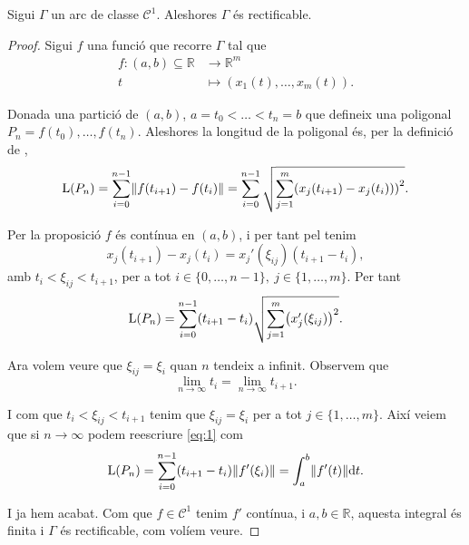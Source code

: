 \documentclass[../Apunts.tex]{subfiles}
\begin{document}
	\begin{proposition}
		Sigui \(\Gamma\) un arc de classe \(\mathcal{C}^{1}\). Aleshores \(\Gamma\) és rectificable.
		\begin{proof}
			Sigui \(f\) una funció que recorre \(\Gamma\) tal que
			\begin{align*}
			f\colon(a,b)\subseteq\mathbb{R}&\longrightarrow\mathbb{R}^{m}\\
			t&\longmapsto(x_{1}(t),\dots,x_{m}(t)).
			\end{align*}
			
			Donada una partició de \((a,b)\), \(a=t_{0}<\dots<t_{n}=b\) que defineix una poligonal \(P_{n}=f(t_{0}),\dots,f(t_{n})\). Aleshores la longitud de la poligonal  és, per la definició de ,
			\[\Long(P_n)=\sum_{i=0}^{n-1}\norm{f(t_{i+1})-f(t_{i})}=\sum_{i=0}^{n-1}\sqrt{\sum_{j=1}^{m}\left(x_{j}(t_{i+1})-x_{j}(t_{i}))\right)^{2}}.\]
			
			Per la proposició  \(f\) és contínua en \((a,b)\), i per tant pel  tenim
			\[x_{j}(t_{i+1})-x_{j}(t_{i})=x_{j}'(\xi_{ij})(t_{i+1}-t_{i}),\]
			amb \(t_{i}<\xi_{ij}<t_{i+1}\), per a tot \(i\in\{0,\dots,n-1\},\ j\in\{1,\dots,m\}\). Per tant
			\begin{equation}\label{eq:1}
			\Long(P_{n})=\sum_{i=0}^{n-1}(t_{i+1}-t_{i})\sqrt{\sum_{j=1}^{m}\left(x_{j}'(\xi_{ij})\right)^2}.
			\end{equation}
			
			Ara volem veure que \(\xi_{ij}=\xi_{i}\) quan \(n\) tendeix a infinit. Observem que
			\[\lim_{n\to\infty}t_{i}=\lim_{n\to\infty}t_{i+1}.\]
			
			I com que \(t_{i}<\xi_{ij}<t_{i+1}\) tenim que \(\xi_{ij}=\xi_{i}\) per a tot \(j\in\{1,\dots,m\}\). Així veiem que si \(n\to\infty\) podem reescriure \eqref{eq:1} com
			\begin{displaymath}
			\Long(P_{n})=\sum_{i=0}^{n-1}(t_{i+1}-t_{i})\norm{f'(\xi_{i})}=\int_{a}^{b}\norm{f'(t)}\text{d}t.
			\end{displaymath}
			
			I ja hem acabat. Com que \(f\in\mathcal{C}^{1}\) tenim \(f'\) contínua, i \(a,b\in\mathbb{R}\), aquesta integral és finita i \(\Gamma\) és rectificable, com volíem veure.
		\end{proof}
	\end{proposition}
\end{document}
